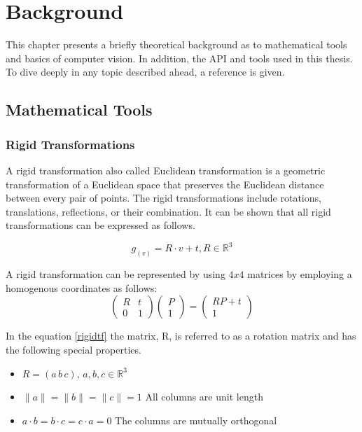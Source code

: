 
\chapter{Background}
\label{chap:back}

This chapter presents a briefly theoretical background as to mathematical tools and basics of computer vision. In addition, the API and tools used in this thesis. To dive deeply in any topic described ahead, a reference is given.


\section{ Mathematical Tools}
\subsection{Rigid Transformations}
A rigid transformation also called Euclidean transformation is a geometric transformation of a Euclidean space that preserves the Euclidean distance between every pair of points. The rigid transformations include rotations, translations, reflections, or their combination. It can be shown that all rigid transformations can be expressed as follows.

\begin{equation}\label{rigidtf}
 g_(v)=R \cdot v + t, R \in \mathbb{R}^{3}
\end{equation}

A rigid transformation can be represented by using $4x4$ matrices by employing a homogenous coordinates as follows:
$$
\begin{pmatrix}
R & t \\
0 & 1
\end{pmatrix}
\begin{pmatrix}
P \\
1
\end{pmatrix}=
\begin{pmatrix}
RP+t \\
1
\end{pmatrix}
$$

 In the equation \ref{rigidtf} the matrix, R, is referred to as a rotation matrix and has the following special properties.
\begin{itemize}
\item $R=(a\,  b\,  c), \, a,b,c \in \mathbb{R}^{3}$
\item $\|a\|=\|b\|=\|c\|=1 $ All columns are unit length
\item $a \cdot b=b \cdot c=c \cdot a=0 $ The columns are mutually orthogonal
\end{itemize}
